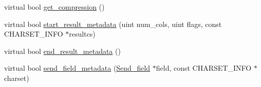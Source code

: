 \begin{DoxyCompactItemize}
\item 
virtual bool \mbox{\hyperlink{classProtocol__local_a968e04275fa9c80a11f0ca5ac7613d31}{get\+\_\+compression}} ()
\item 
virtual bool \mbox{\hyperlink{classProtocol__local_adcef21ebd2f41ca61731c874ccfb1762}{start\+\_\+result\+\_\+metadata}} (uint num\+\_\+cols, uint flags, const C\+H\+A\+R\+S\+E\+T\+\_\+\+I\+N\+FO $\ast$resultcs)
\item 
virtual bool \mbox{\hyperlink{classProtocol__local_adc7012afe880218e2903dac0a22f0f8c}{end\+\_\+result\+\_\+metadata}} ()
\item 
virtual bool \mbox{\hyperlink{classProtocol__local_a4134598d48b8fb89a69fcae71d348ed2}{send\+\_\+field\+\_\+metadata}} (\mbox{\hyperlink{classSend__field}{Send\+\_\+field}} $\ast$field, const C\+H\+A\+R\+S\+E\+T\+\_\+\+I\+N\+FO $\ast$charset)
\end{DoxyCompactItemize}
